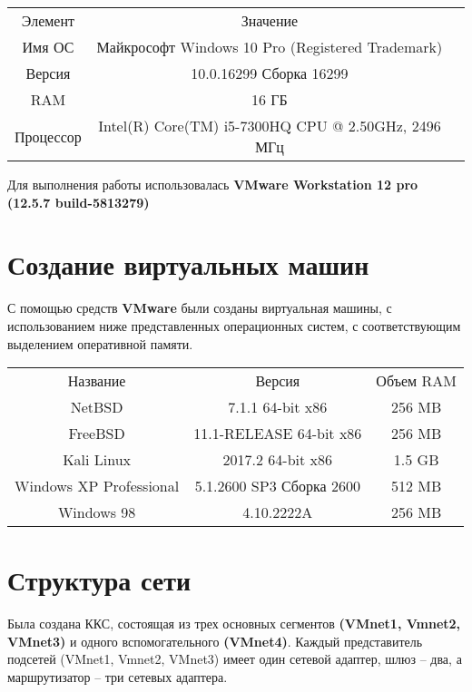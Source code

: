 \documentclass[14pt,a4paper,report]{report}
\begin{document}
\begin{center}
\begin{tabular}{ c c c }
 Элемент & Значение  \\ 
 Имя ОС & Майкрософт Windows 10 Pro (Registered Trademark) \\  
    Версия & 10.0.16299 Сборка 16299 \\     
 RAM & 16 ГБ     \\
  Процессор & Intel(R) Core(TM) i5-7300HQ CPU @ 2.50GHz, 2496 МГц    \\
 
\end{tabular}
\end{center}

Для выполнения работы использовалась \textbf{VMware Workstation 12 pro (12.5.7 build-5813279)}

\section{Создание виртуальных машин}
С помощью средств \textbf{VMware} были созданы виртуальная машины, с использованием ниже представленных операционных систем, с соответствующим выделением оперативной памяти.

\begin{center}
\begin{tabular}{ c c c }
 Название & Версия & Объем RAM  \\ 
NetBSD &7.1.1 64-bit x86&256 MB \\  
    FreeBSD &11.1-RELEASE 64-bit x86&256 MB \\     
 Kali Linux &2017.2 64-bit x86&1.5 GB     \\
  Windows XP Professional &5.1.2600 SP3 Сборка 2600&512 MB   \\
Windows 98 & 4.10.2222A&256 MB    \\
\end{tabular}
\end{center}



\section{Структура сети}
Была создана ККС, состоящая из трех основных сегментов \textbf{(VMnet1, Vmnet2, VMnet3)} и одного вспомогательного \textbf{(VMnet4)}. Каждый представитель подсетей (VMnet1, Vmnet2, VMnet3) имеет один сетевой адаптер, шлюз – два, а маршрутизатор – три сетевых адаптера.
\end{document}
